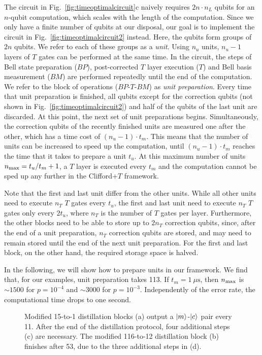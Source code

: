 \documentclass[prx,aps,letterpaper,twocolumn,allowfontchageintitle=true,accepted=2019-02-01]{quantumarticle}
\begin{document}
The circuit in Fig.~\ref{fig:timeoptimalcircuit}c naively requires $2n \cdot n_L$ qubits for an $n$-qubit computation, which scales with the length of the computation. Since we only have a finite number of qubits at our disposal, our goal is to implement the circuit in Fig.~\ref{fig:timeoptimalcircuit2} instead. Here, the qubits form groups of $2n$ qubits. We refer to each of these groups as a \textit{unit}. Using $n_u$ units, $n_u-1$ layers of $T$ gates can be performed at the same time. In the circuit, the steps of Bell state preparation ($BP$), post-corrected $T$ layer execution ($T$) and Bell basis measurement ($BM$) are performed repeatedly until the end of the computation. We refer to the block of operations ($BP$-$T$-$BM$) as \textit{unit preparation}. Every time that unit preparation is finished, all qubits except for the correction qubits (not shown in Fig.~\ref{fig:timeoptimalcircuit2}) and half of the qubits of the last unit are discarded. At this point, the next set of unit preparations begins. Simultaneously, the correction qubits of the recently finished units are measured one after the other, which has a time cost of $(n_u-1) \cdot t_m$. This means that the number of units can be increased to speed up the computation, until $(n_u-1) \cdot t_m$ reaches the time that it takes to prepare a unit $t_u$. At this maximum number of units $n_{\rm max} = t_u/t_m+1$, a $T$ layer is executed every $t_m$ and the computation cannot be sped up any further in the Clifford+$T$ framework.

Note that the first and last unit differ from the other units. While all other units need to execute $n_T$ $T$ gates every $t_u$, the first and last unit need to execute $n_T$ $T$ gates only every $2t_u$, where $n_T$ is the number of $T$ gates per layer. Furthermore, the other blocks need to be able to store up to $2n_T$ correction qubits, since, after the end of a unit preparation, $n_T$ correction qubits are stored, and may need to remain stored until the end of the next unit preparation. For the first and last block, on the other hand, the required storage space is halved.

In the following, we will show how to prepare units in our framework. We find that, for our examples, unit preparation takes 113\clock. If $t_m = 1~\mu\mathrm{s}$, then $n_{\rm max}$ is ${\sim}1500$ for $p=10^{-4}$ and ${\sim}3000$ for $p=10^{-3}$. Independently of the error rate, the computational time drops to one second.

\begin{figure}[t!]
\centering
\def\svgwidth{0.9\linewidth}

\caption{Modified 15-to-1 distillation blocks (a) output a $\ket{m}$-$\ket{c}$ pair every 11\clock. After the end of the distillation protocol, four additional steps (c) are necessary. The modified 116-to-12 distillation block (b) finishes after 53\clock, due to the three additional steps in (d).}
\label{fig:modifieddistillation}
\end{figure}
\end{document}

